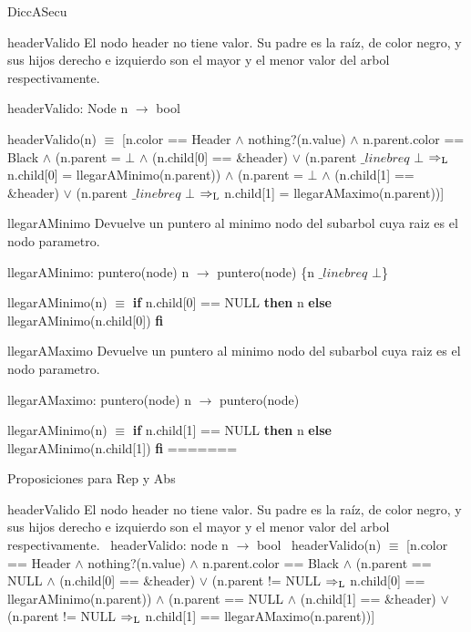 \begin{DoxyParagraph}{\-Dicc\-A\-Secu}
\begin{DoxyParagraph}{header\-Valido}
\-El nodo header no tiene valor. \-Su padre es la raíz, de color negro, y sus hijos derecho e izquierdo son el mayor y el menor valor del arbol respectivamente.
\end{DoxyParagraph}
header\-Valido\-: \-Node n $\to$ bool\par
 header\-Valido(n) $\equiv$ \mbox{[}n.\-color == \-Header $\land$ nothing?(n.\-value) $\land$ n.\-parent.\-color == \-Black $\land$ (n.\-parent = $\bot$ $\land$ (n.\-child\mbox{[}0\mbox{]} == \&header) $\lor$ (n.\-parent $\_linebr eq$ $\bot$ $\Rightarrow_{\rm L}$ n.\-child\mbox{[}0\mbox{]} = llegar\-A\-Minimo(n.\-parent)) $\land$ (n.\-parent = $\bot$ $\land$ (n.\-child\mbox{[}1\mbox{]} == \&header) $\lor$ (n.\-parent $\_linebr eq$ $\bot$ $\Rightarrow_{\rm L}$ n.\-child\mbox{[}1\mbox{]} = llegar\-A\-Maximo(n.\-parent))\mbox{]} 

\begin{DoxyParagraph}{llegar\-A\-Minimo}
\-Devuelve un puntero al minimo nodo del subarbol cuya raiz es el nodo parametro.
\end{DoxyParagraph}
llegar\-A\-Minimo\-: puntero(node) n $\to$ puntero(node) \{n $\_linebr eq$ $\bot$\}\par
 llegar\-A\-Minimo(n) $\equiv$ {\bfseries if} n.\-child\mbox{[}0\mbox{]} == \-N\-U\-L\-L {\bfseries then} n {\bfseries else} llegar\-A\-Minimo(n.\-child\mbox{[}0\mbox{]}) {\bfseries fi} 

\begin{DoxyParagraph}{llegar\-A\-Maximo}
\-Devuelve un puntero al minimo nodo del subarbol cuya raiz es el nodo parametro.
\end{DoxyParagraph}
llegar\-A\-Maximo\-: puntero(node) n $\to$ puntero(node)\par
 llegar\-A\-Minimo(n) $\equiv$ {\bfseries if} n.\-child\mbox{[}1\mbox{]} == \-N\-U\-L\-L {\bfseries then} n {\bfseries else} llegar\-A\-Minimo(n.\-child\mbox{[}1\mbox{]}) {\bfseries fi} 
=======

Proposiciones para Rep y Abs

\begin{DoxyParagraph}{header\+Valido}
El nodo header no tiene valor. Su padre es la raíz, de color negro, y sus hijos derecho e izquierdo son el mayor y el menor valor del arbol respectivamente.~\newline
header\+Valido\+: node n $\to$ bool~\newline
header\+Valido(n) $\equiv$ \mbox{[}n.\+color == Header $\land$ nothing?(n.\+value) $\land$ n.\+parent.\+color == Black $\land$ (n.\+parent == N\+U\+LL $\land$ (n.\+child\mbox{[}0\mbox{]} == \&header) $\lor$ (n.\+parent != N\+U\+LL $\Rightarrow_{\rm L}$ n.\+child\mbox{[}0\mbox{]} == llegar\+A\+Minimo(n.\+parent)) $\land$ (n.\+parent == N\+U\+LL $\land$ (n.\+child\mbox{[}1\mbox{]} == \&header) $\lor$ (n.\+parent != N\+U\+LL $\Rightarrow_{\rm L}$ n.\+child\mbox{[}1\mbox{]} == llegar\+A\+Maximo(n.\+parent))\mbox{]} 
\end{DoxyParagraph}



\end{DoxyParagraph}
